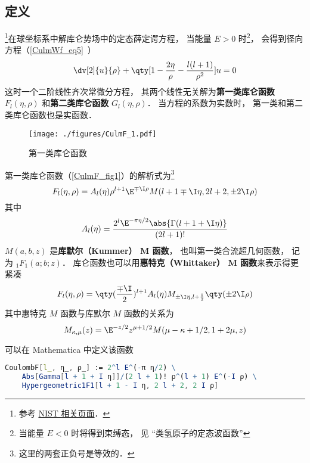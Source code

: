 

\subsection{定义}
\footnote{参考 \href{https://dlmf.nist.gov/33.2}{NIST 相关页面}．}在球坐标系中解库仑势场中的定态薛定谔方程， 当能量 $E > 0$ 时\footnote{当能量 $E < 0$ 时将得到束缚态， 见 “类氢原子的定态波函数”}， 会得到径向方程（\autoref{CulmWf_eq5}~）
\begin{equation}
\dv[2]{u}{\rho} + \qty[1 - \frac{2\eta}{\rho} - \frac{l(l+1)}{\rho^2}]u = 0
\end{equation}
这时一个二阶线性齐次常微分方程， 其两个线性无关解为\textbf{第一类库仑函数} $F_l(\eta, \rho)$ 和\textbf{第二类库仑函数} $G_l(\eta, \rho)$． 当方程的系数为实数时， 第一类和第二类库仑函数也是实函数．

\begin{figure}[ht]
\centering
\texttt{[image: ./figures/CulmF\_1.pdf]}
\caption{第一类库仑函数} \label{CulmF_fig1}
\end{figure}

第一类库仑函数（\autoref{CulmF_fig1}）的解析式为\footnote{这里的两套正负号是等效的．}
\begin{equation}
F_l(\eta, \rho) = A_l(\eta) \rho^{l+1} \E^{\mp\I\rho} M(l+1\mp\I\eta, 2l+2, \pm 2\I\rho)
\end{equation}
其中
\begin{equation}
A_l(\eta) = \frac{2^l \E^{-\pi\eta/2} \abs{\Gamma(l+1+\I\eta)}}{(2l+1)!}
\end{equation}
$M(a, b, z)$ 是\textbf{库默尔（Kummer） M 函数}， 也叫第一类合流超几何函数， 记为 $_1 F_1(a;b;z)$． 库仑函数也可以用\textbf{惠特克（Whittaker） M 函数}来表示得更紧凑
\begin{equation}
F_l(\eta, \rho) = \qty(\frac{\mp\I}{2})^{l+1} A_l(\eta) M_{\pm\I\eta, l+\frac12}\qty(\pm 2\I\rho)
\end{equation}
其中惠特克 $M$ 函数与库默尔 $M$ 函数的关系为
\begin{equation}
M_{\kappa, \mu}(z) = \E^{-z/2} z^{\mu + 1/2} M(\mu - \kappa + 1/2, 1 + 2\mu, z)
\end{equation}

可以在 Mathematica 中定义该函数
\begin{lstlisting}[language=Mathematica]
CoulombF[l_, η_, ρ_] := 2^l E^(-π η/2) \
    Abs[Gamma[l + 1 + I η]]/(2 l + 1)! ρ^(l + 1) E^(-I ρ) \
    Hypergeometric1F1[l + 1 - I η, 2 l + 2, 2 I ρ]
\end{lstlisting}

